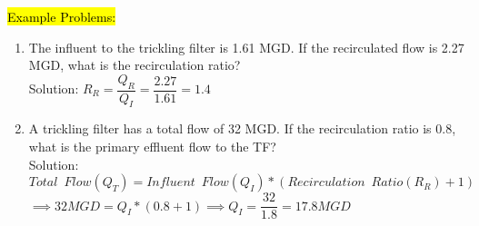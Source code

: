 \hl{Example Problems:}\\
\begin{enumerate}
\item The influent to the trickling filter is 1.61 MGD. If the recirculated flow is 2.27 MGD, what is the recirculation ratio?\\
\vspace{0.2cm}
Solution:  $R_R=\dfrac{Q_R}{Q_I}=\dfrac{2.27}{1.61}=\boxed{1.4}$\\
\vspace{0.2cm}
\item A trickling filter has a total flow of 32 MGD.  If the recirculation ratio is 0.8, what is the primary effluent flow to the TF?\\
\vspace{0.2cm}
Solution:\\
\vspace{0.2cm}
$Total \enspace Flow (Q_T) = Influent \enspace Flow (Q_I)*(Recirculation \enspace Ratio(R_R) +1)$\\
$\implies 32 MGD=Q_I*(0.8+1)\implies Q_I=\dfrac{32}{1.8}=\boxed{17.8 MGD}$
\end{enumerate}

